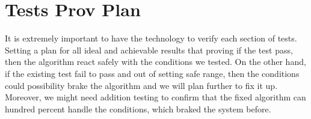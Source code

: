 \documentclass[10pt,draftclsnofoot,onecolumn,journal,compsoc]{IEEEtran}
\begin{document}
\section{Tests Prov Plan}
It is extremely important to have the technology to verify each section of tests. Setting a plan for all ideal and achievable results that proving if the test pass, then the algorithm react safely with the conditions we tested. On the other hand, if the existing test fail to pass and out of setting safe range, then the conditions could possibility brake the algorithm and we will plan further to fix it up. Moreover, we might need addition testing to confirm that the fixed algorithm can hundred percent handle the conditions, which braked the system before.    






















\newpage


\end{document}
